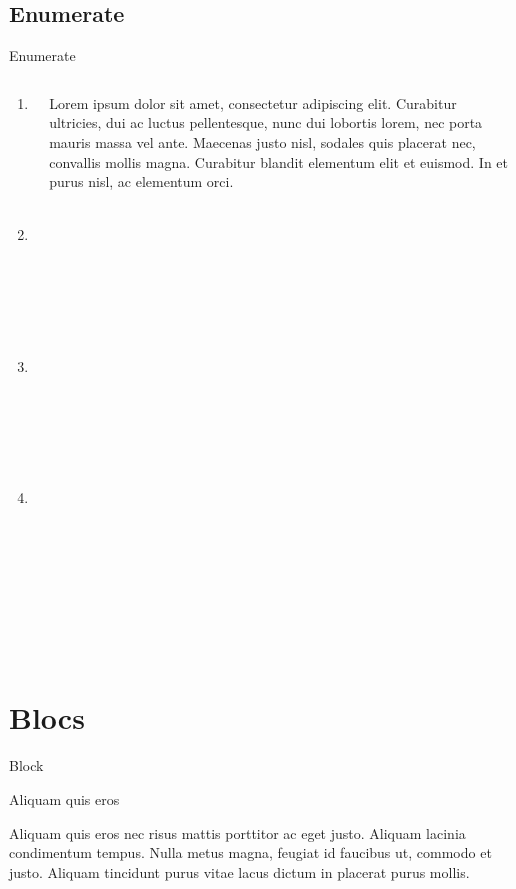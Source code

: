 \documentclass{beamer}
\begin{document}
\subsection{Enumerate}
\begin{frame}{Enumerate}
\begin{columns}
  \begin{column}[l]{0.45\paperwidth}
      \begin{enumerate}
        \item Lorem ;
        \item<2-> Ipsum ;
        \item<2-> Dolor ;
        \item<2-> Sit amet.
      \end{enumerate}
  \end{column}

  \begin{column}[r]{0.45\paperwidth}
    Lorem ipsum dolor sit amet, consectetur adipiscing elit. Curabitur 
    ultricies, dui ac luctus pellentesque, nunc dui lobortis lorem, nec 
    porta mauris massa vel ante. Maecenas justo nisl, sodales quis 
    placerat nec, convallis mollis magna. Curabitur blandit elementum 
    elit et euismod. In et purus nisl, ac elementum orci.
  \end{column}
\end{columns}

\end{frame}

\section{Blocs}
\begin{frame}{}
\end{frame}

\begin{frame}{Block}
  \begin{block}{Aliquam quis eros}

    Aliquam quis eros nec risus mattis porttitor ac eget justo. 
    Aliquam lacinia condimentum tempus. Nulla metus magna, feugiat 
    id faucibus ut, commodo et justo. Aliquam tincidunt purus vitae 
    lacus dictum in placerat purus mollis. 

  \end{block}
\end{frame}
\end{document}

